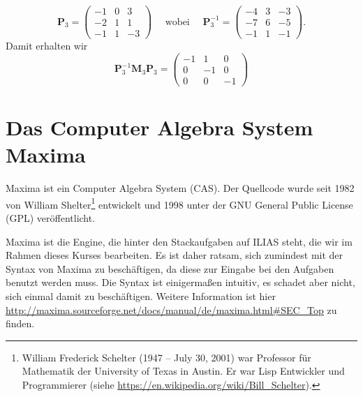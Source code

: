 \[
\mathbf{P}_3=
\begin{pmatrix}-1&0&3\\ -2&1&1\\ -1&1&-3\end{pmatrix}\quad\text{ wobei }\quad
\mathbf{P}_3^{-1}=
\begin{pmatrix}-4&3&-3\\ -7&6&-5\\ -1&1&-1\end{pmatrix}.
\]
Damit erhalten wir 
\[
\mathbf{P}_3^{-1}\mathbf{M}_3\mathbf{P}_3=
\begin{pmatrix}-1&1&0\\ 0&-1&0\\ 0&0&-1\end{pmatrix}
\]
\section{Das Computer Algebra System Maxima}
Maxima ist ein Computer Algebra System (CAS). Der Quellcode wurde seit 1982 von William Shelter\footnote{William Frederick Schelter (1947 – July 30, 2001) war Professor für Mathematik der  University of Texas in Austin. Er war Lisp Entwickler und  Programmierer (siehe \url{https://en.wikipedia.org/wiki/Bill_Schelter}).}  entwickelt und 1998 unter der GNU General Public License (GPL) veröffentlicht.

Maxima ist die Engine, die hinter den Stackaufgaben auf ILIAS steht, die wir im Rahmen dieses Kurses bearbeiten. Es ist daher ratsam, sich zumindest mit der Syntax von Maxima zu beschäftigen, da diese zur Eingabe bei den Aufgaben benutzt werden muss. Die Syntax ist einigermaßen intuitiv, es schadet aber nicht, sich einmal damit zu beschäftigen. Weitere Information ist hier 
\url{http://maxima.sourceforge.net/docs/manual/de/maxima.html#SEC_Top} 
zu finden.
\newpage
